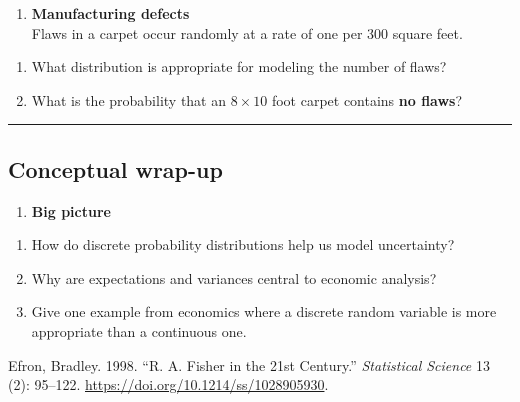 \documentclass[
  letterpaper,
  DIV=11,
  numbers=noendperiod]{scrreprt}
\newlength{\cslhangindent}
\newenvironment{CSLReferences}[2] %
 {\begin{list}{}{%
  \setlength{\itemindent}{0pt}
  \setlength{\leftmargin}{0pt}
  \setlength{\parsep}{0pt}
  \ifodd #1
   \setlength{\leftmargin}{\cslhangindent}
   \setlength{\itemindent}{-1\cslhangindent}
  \fi
  \setlength{\itemsep}{#2\baselineskip}}}
 {\end{list}}
\providecommand{\tightlist}{%
  \setlength{\itemsep}{0pt}\setlength{\parskip}{0pt}}
\begin{document}
\begin{enumerate}
\def\labelenumi{\arabic{enumi}.}
\setcounter{enumi}{11}
\tightlist
\item
  \textbf{Manufacturing defects}\\
  Flaws in a carpet occur randomly at a rate of one per 300 square feet.
\end{enumerate}

\begin{enumerate}
\def\labelenumi{(\alph{enumi})}
\tightlist
\item
  What distribution is appropriate for modeling the number of flaws?\\
\item
  What is the probability that an \(8 \times 10\) foot carpet contains
  \textbf{no flaws}?
\end{enumerate}

\begin{center}\rule{0.5\linewidth}{0.5pt}\end{center}

\subsection{Conceptual wrap-up}\label{conceptual-wrap-up}

\begin{enumerate}
\def\labelenumi{\arabic{enumi}.}
\setcounter{enumi}{12}
\tightlist
\item
  \textbf{Big picture}
\end{enumerate}

\begin{enumerate}
\def\labelenumi{(\alph{enumi})}
\tightlist
\item
  How do discrete probability distributions help us model uncertainty?\\
\item
  Why are expectations and variances central to economic analysis?\\
\item
  Give one example from economics where a discrete random variable is
  more appropriate than a continuous one.
\end{enumerate}

\label{refs}
\begin{CSLReferences}{1}{0}
Efron, Bradley. 1998. {``R. A. Fisher in the 21st Century.''}
\emph{Statistical Science} 13 (2): 95--122.
\url{https://doi.org/10.1214/ss/1028905930}.

\end{CSLReferences}
\end{document}
